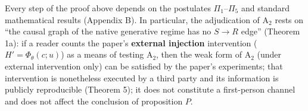 \begin{remark}
Every step of the proof above depends on the postulates $\Pi_1$--$\Pi_5$ and standard
mathematical results (Appendix B). In particular, the adjudication of $\mathrm{A}_2$ rests on
``the causal graph of the native generative regime has no $S \to R$ edge'' (Theorem 1a): if a
reader counts the paper's \textbf{external injection} intervention ($H' = \Phi_\theta(c; u)$)
as a means of testing $\mathrm{A}_2$, then the weak form of $\mathrm{A}_2$ (under external
intervention only) can be satisfied by the paper's
experiments\cite{lindsey-2026-introspection}; that intervention is nonetheless executed by a third
party and its information is publicly reproducible (Theorem 5); it does not constitute a
first-person channel and does not affect the conclusion of proposition $P$.
\end{remark}

\clearpage

